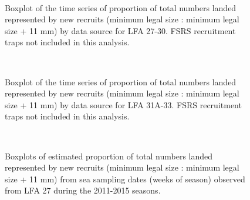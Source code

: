 \documentclass[11pt]{article}
\newcommand{\e}{/backup/bio_data/bio.lobster/figures/} %
\begin{document}
\begin{figure}
        \centering
         \\
                     \caption{Boxplot of the time series of proportion of total numbers landed represented by new recruits (minimum legal size : minimum legal size + 11 mm) by data source for LFA 27-30. FSRS recruitment traps not included in this analysis.}
        \end{figure}

\begin{figure}
        \centering
         \\
                    \caption{Boxplot of the time series of proportion of total numbers landed represented by new recruits (minimum legal size : minimum legal size + 11 mm) by data source for LFA 31A-33. FSRS recruitment traps not included in this analysis.}
        \end{figure}

\begin{figure}
        \centering
         \\
                     \caption{Boxplots of estimated proportion of total numbers landed represented by new recruits (minimum legal size : minimum legal size + 11 mm) from sea sampling dates (weeks of season) observed from LFA 27 during the 2011-2015 seasons. }
        \end{figure}
\end{document}
